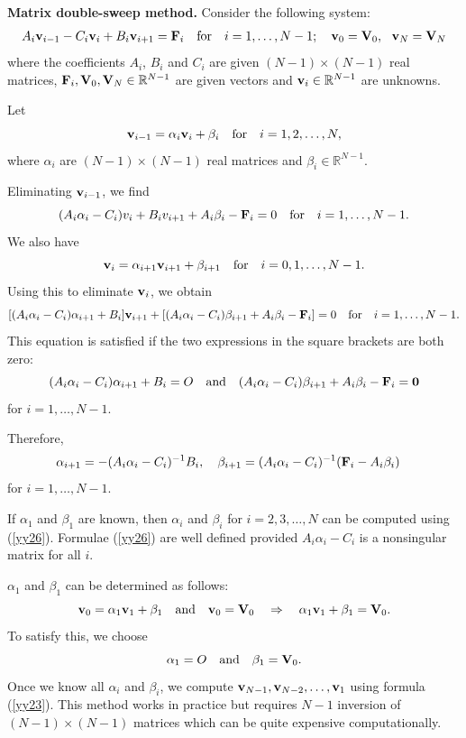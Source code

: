 \vskip 0.3cm  
\textbf{Matrix double-sweep method.}
Consider the following system:
\begin{equation}
A_{i}{\bf v}_{i-1}-C_{i}{\bf v}_{i}+B_{i}{\bf v}_{i+1}={\bf F}_{i} \quad \hbox{for}\quad i=1, \dots, N-1;
\quad {\bf v}_{0}={{\bf V}_{0}}, \ \ {\bf v}_{N}={{\bf V}_{N}} \label{yy22}
\end{equation}
where the coefficients $A_{i}$, $B_{i}$ and $C_{i}$ are given $(N-1)\times(N-1)$ real matrices,
${\bf F}_{i}, {{\bf V}_{0}}, {{\bf V}_{N}}\in\mathbb{R}^{N-1}$ are given vectors and ${\bf v}_{i}\in\mathbb{R}^{N-1}$ are unknowns.

Let
\begin{equation}
{\bf v}_{i-1}=\alpha_{i}{\bf v}_{i}+\beta_{i}  \quad  \hbox{for} \quad
i=1, 2, \dots, N, \label{yy23}
\end{equation}
where $\alpha_{i}$ are $(N-1)\times(N-1)$ real matrices
and $\beta_{i}\in\mathbb{R}^{N-1}$.

Eliminating ${\bf v}_{i-1}$, we find
\[
(A_{i}\alpha_{i}-C_{i})v_{i}+B_{i}v_{i+1}+A_{i}\beta_{i} - {\bf F}_{i}=0 \quad \hbox{for}\quad i=1, \dots, N-1.
\]
We also have
\[
{\bf v}_{i}=\alpha_{i+1}{\bf v}_{i+1}+\beta_{i+1}  \quad  \hbox{for} \quad
i=0, 1, \dots, N-1.
\]
Using this to eliminate ${\bf v}_{i}$, we obtain
\[
[(A_{i}\alpha_{i}-C_{i})\alpha_{i+1}+B_{i}]{\bf v}_{i+1}+[
(A_{i}\alpha_{i}-C_{i})\beta_{i+1}+A_{i}\beta_{i}-{\bf F}_{i}]=0 \quad \hbox{for}\quad i=1, \dots, N-1.
\]
This equation is satisfied if the two expressions in the square brackets are both zero:
\[
(A_{i}\alpha_{i}-C_{i})\alpha_{i+1}+B_{i}=O \quad \textrm{and} \quad
(A_{i}\alpha_{i}-C_{i})\beta_{i+1}+A_{i}\beta_{i}-{\bf F}_{i}=\mathbf{0}
\]
for $i=1, \dots, N-1$.

Therefore,
\begin{equation}
\alpha_{i+1}=-(A_{i}\alpha_{i}-C_{i})^{-1}B_{i}, \quad
\beta_{i+1}=(A_{i}\alpha_{i}-C_{i})^{-1}({\bf F}_{i}-A_{i}\beta_{i}) \quad
 \label{yy26}
\end{equation}
for $i=1, \dots, N-1$.

If $\alpha_{1}$ and  $\beta_{1}$ are known, then $\alpha_{i}$ and  $\beta_{i}$ for $i=2, 3, \dots, N$
can be computed using (\ref{yy26}). Formulae (\ref{yy26}) are well defined provided
$A_{i}\alpha_{i}-C_{i}$
is a nonsingular matrix for all $i$.

$\alpha_{1}$ and  $\beta_{1}$ can be determined as follows:
\[
{\bf v}_{0}= \alpha_{1}{\bf v}_{1}+\beta_{1} \quad \hbox{and} \quad {\bf v}_{0}={\bf V}_{0} \quad \Rightarrow \quad
\alpha_{1}{\bf v}_{1}+\beta_{1}={\bf V}_{0}.
\]
To satisfy this, we choose
\[
\alpha_{1}=O \quad \textrm{and} \quad \beta_{1}={\bf V}_{0}.
\]
Once we know all $\alpha_{i}$
and $\beta_{i}$, we compute ${\bf v}_{N-1}, {\bf v}_{N-2}, \dots, {\bf v}_{1}$ using formula (\ref{yy23}).
This method works in practice but requires $N-1$ inversion of $(N-1)\times(N-1)$ matrices which
can be quite expensive computationally.


